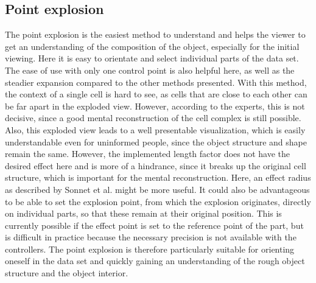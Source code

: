 \subsection{Point explosion}
The point explosion is the easiest method to understand and helps the viewer to get an understanding of the composition of the object, especially for the initial viewing.
Here it is easy to orientate and select individual parts of the data set.
The ease of use with only one control point is also helpful here, as well as the steadier expansion compared to the other methods presented.
With this method, the context of a single cell is hard to see, as cells that are close to each other can be far apart in the exploded view. However, according to the experts, this is not decisive, since a good mental reconstruction of the cell complex is still possible. Also, this exploded view leads to a well presentable visualization, which is easily understandable even for uninformed people, since the object structure and shape remain the same.
However, the implemented length factor does not have the desired effect here and is more of a hindrance, since it breaks up the original cell structure, which is important for the mental reconstruction.
Here, an effect radius as described by Sonnet et al. might be more useful.
It could also be advantageous to be able to set the explosion point, from which the explosion originates, directly on individual parts, so that these remain at their original position.
This is currently possible if the effect point is set to the reference point of the part, but is difficult in practice because the necessary precision is not available with the controllers.
The point explosion is therefore particularly suitable for orienting oneself in the data set and quickly gaining an understanding of the rough object structure and the object interior.

